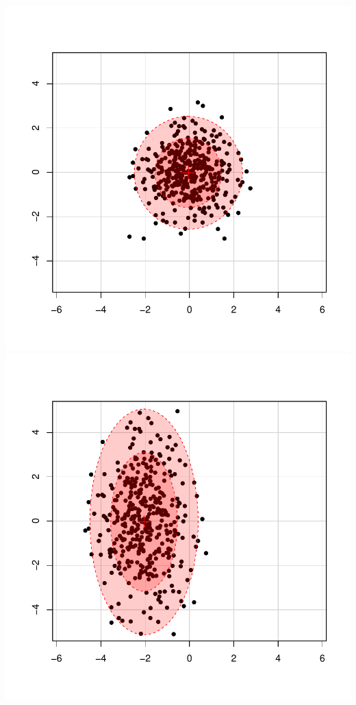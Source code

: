 \documentclass[landscape,footrule]{foils}
\begin{document}
\begin{center}
\includegraphics[scale=0.65]{source-distribution.pdf}
\includegraphics[scale=0.65]{scaled-distribution.pdf}
\end{center}\vspace*{-10cm}
\end{document}
